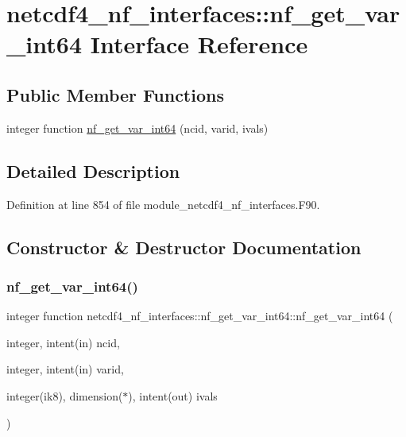 \hypertarget{interfacenetcdf4__nf__interfaces_1_1nf__get__var__int64}{}\section{netcdf4\+\_\+nf\+\_\+interfaces\+:\+:nf\+\_\+get\+\_\+var\+\_\+int64 Interface Reference}
\label{interfacenetcdf4__nf__interfaces_1_1nf__get__var__int64}
\subsection*{Public Member Functions}
\begin{DoxyCompactItemize}
\item 
integer function \hyperlink{interfacenetcdf4__nf__interfaces_1_1nf__get__var__int64_a3a3defc21e57ced58e3d1763465920fd}{nf\+\_\+get\+\_\+var\+\_\+int64} (ncid, varid, ivals)
\end{DoxyCompactItemize}


\subsection{Detailed Description}


Definition at line 854 of file module\+\_\+netcdf4\+\_\+nf\+\_\+interfaces.\+F90.



\subsection{Constructor \& Destructor Documentation}
\mbox{\label{interfacenetcdf4__nf__interfaces_1_1nf__get__var__int64_a3a3defc21e57ced58e3d1763465920fd}} 
\subsubsection{\texorpdfstring{nf\+\_\+get\+\_\+var\+\_\+int64()}{nf\_get\_var\_int64()}}
{\footnotesize\ttfamily integer function netcdf4\+\_\+nf\+\_\+interfaces\+::nf\+\_\+get\+\_\+var\+\_\+int64\+::nf\+\_\+get\+\_\+var\+\_\+int64 (\begin{DoxyParamCaption}\item[{integer, intent(in)}]{ncid,  }\item[{integer, intent(in)}]{varid,  }\item[{integer(ik8), dimension($\ast$), intent(out)}]{ivals }\end{DoxyParamCaption})}



